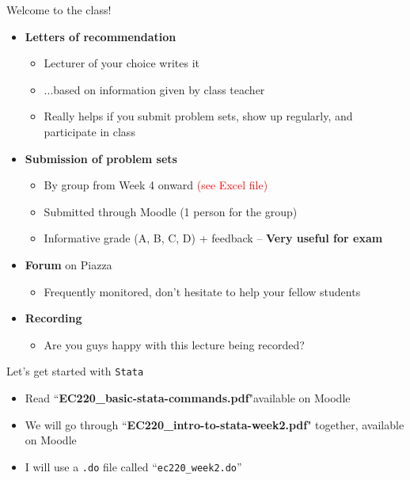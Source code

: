 \documentclass[aspectratio=169, 11pt]{beamer}
\begin{document}
\begin{frame}{Welcome to the class!}

    \begin{itemize}[<+- | alert@+>]
        \item \textbf{Letters of recommendation}
        \begin{itemize}
            \item Lecturer of your choice writes it
            \item ...based on information given by class teacher
            \item Really helps if you submit problem sets, show up regularly, and participate in class
        \end{itemize}
        \item \textbf{Submission of problem sets}
        \begin{itemize}
            \item By group from Week 4 onward \textcolor{red}{(see Excel file)}
            \item Submitted through Moodle (1 person for the group)
            \item Informative grade (A, B, C, D) + feedback -- \textbf{Very useful for exam}
        \end{itemize}
        \item \textbf{Forum} on Piazza
        \begin{itemize}
            \item Frequently monitored, don't hesitate to help your fellow students
        \end{itemize}
    \item \textbf{Recording}
    \begin{itemize}
        \item Are you guys happy with this lecture being recorded?
    \end{itemize}
    \end{itemize}

\end{frame}

\begin{frame}{Let's get started with \texttt{Stata}}

    \begin{itemize}[<+- | alert@+>]
        \item Read ``\textbf{EC220\_basic-stata-commands.pdf}"available on Moodle
        \item We will go through ``\textbf{EC220\_intro-to-stata-week2.pdf}" together, available on Moodle
        \item I will use a \texttt{.do} file called ``\texttt{ec220\_week2.do}''
    \end{itemize}

\end{frame}
\end{document}
